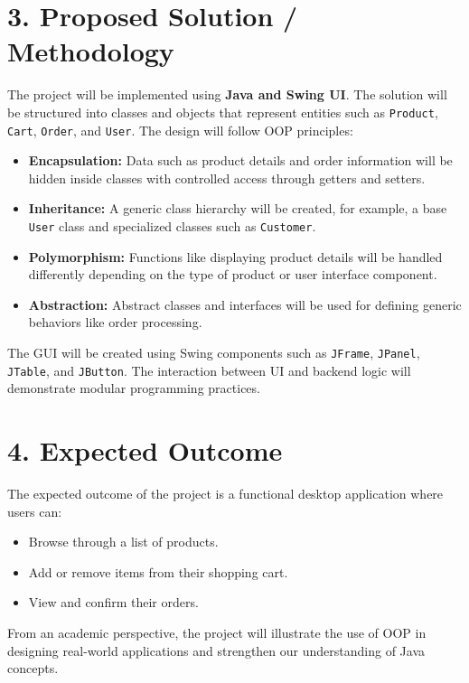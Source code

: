 \documentclass[12pt,a4paper]{article}
\begin{document}
\section*{3. Proposed Solution / Methodology}
The project will be implemented using \textbf{Java and Swing UI}. The solution will be structured into classes and objects that represent entities such as \texttt{Product}, \texttt{Cart}, \texttt{Order}, and \texttt{User}. The design will follow OOP principles:
\begin{itemize}[nosep]
    \item \textbf{Encapsulation:} Data such as product details and order information will be hidden inside classes with controlled access through getters and setters.
    \item \textbf{Inheritance:} A generic class hierarchy will be created, for example, a base \texttt{User} class and specialized classes such as \texttt{Customer}.
    \item \textbf{Polymorphism:} Functions like displaying product details will be handled differently depending on the type of product or user interface component.
    \item \textbf{Abstraction:} Abstract classes and interfaces will be used for defining generic behaviors like order processing.
\end{itemize}

The GUI will be created using Swing components such as \texttt{JFrame}, \texttt{JPanel}, \texttt{JTable}, and \texttt{JButton}. The interaction between UI and backend logic will demonstrate modular programming practices.

\section*{4. Expected Outcome}
The expected outcome of the project is a functional desktop application where users can:
\begin{itemize}[nosep]
    \item Browse through a list of products.
    \item Add or remove items from their shopping cart.
    \item View and confirm their orders.
\end{itemize}
From an academic perspective, the project will illustrate the use of OOP in designing real-world applications and strengthen our understanding of Java concepts.
\end{document}
